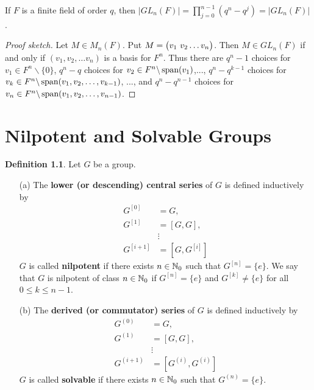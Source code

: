 \documentclass[11pt]{book}
\theoremstyle{definition}   \newtheorem{defn}[counter]{Definition} %
\newcommand{\bs}{\backslash}   \newcommand{\A}{\mathcal{A}}   \newcommand{\sy}{\textnormal{Syl}}   \newcommand{\size}[1]{\left| #1 \right|}
\newcommand{\vs}{\vspace{8pt}}
\numberwithin{counter}{chapter}
\begin{document}
\vs

\begin{lemma}
If $F$ is a finite field of order $q$, then $|GL_n(F)| = \prod_{j=0}^{n-1} (q^n - q^j) = |GL_n(F)|$.
\end{lemma}

\begin{proof}[Proof sketch]
Let $M \in M_n(F)$. Put $M = \begin{pmatrix} v_1 \ v_2 \dots v_n \end{pmatrix}$. Then $M \in GL_n(F)$ if and only if $(v_1, v_2, \dots v_n)$ is a basis for $F^n$. Thus there are $q^n-1$ choices for $v_1 \in F^n \bs \{0\}$, $q^n-q$ choices for $v_2 \in F^n \bs \spn(v_1)$,..., $q^n-q^{k-1}$ choices for $v_k \in F^n \bs \spn(v_1,v_2,\dots,v_{k-1})$, ..., and $q^{n}-q^{n-1}$ choices for $v_n \in F^n\bs\spn(v_1,v_2,\dots,v_{n-1})$.
\end{proof}



\chapter{Nilpotent and Solvable Groups}

\begin{defn}
Let $G$ be a group.
\begin{enumerate}
\item[(a)] The \textbf{lower (or descending) central series} of $G$ is defined inductively by
	\begin{align*}
	G^{[0]} &= G, \\
	G^{[1]} &= [G,G], \\
	&\vdots \\
	G^{[i+1]} &= [G, G^{[i]}]
	\end{align*}
$G$ is called \textbf{nilpotent} if there exists $n \in \operatorname{\mathbb{N}}_0$ such that $G^{[n]} = \{e\}$. We say that $G$ is nilpotent of class $n \in \operatorname{\mathbb{N}}_0$ if $G^{[n]} = \{e\}$ and $G^{[k]} \ne \{e\}$ for all $0 \leq k \leq n-1$.

\item[(b)] The \textbf{derived (or commutator) series} of $G$ is defined inductively by
	\begin{align*}
	G^{(0)} &= G, \\
	G^{(1)} &= [G,G], \\
	&\vdots \\
	G^{(i+1)} &= [G^{(i)},G^{(i)}]
	\end{align*}
$G$ is called \textbf{solvable} if there exists $n \in \operatorname{\mathbb{N}}_0$ such that $G^{(n)} = \{e\}$.
\end{enumerate}
\end{defn}
\end{document}
